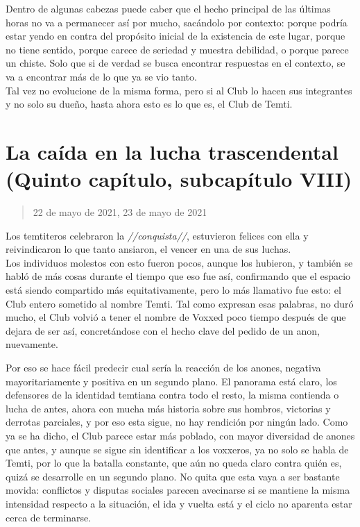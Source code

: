 \documentclass[
  spanish,
]{book}
\begin{document}
Dentro de algunas cabezas puede caber que el hecho principal de las últimas horas no va a permanecer así por mucho, sacándolo por contexto: porque podría estar yendo en contra del propósito inicial de la existencia de este lugar, porque no tiene sentido, porque carece de seriedad y muestra debilidad, o porque parece un chiste. Solo que si de verdad se busca encontrar respuestas en el contexto, se va a encontrar más de lo que ya se vio tanto.\\
Tal vez no evolucione de la misma forma, pero si al Club lo hacen sus integrantes y no solo su dueño, hasta ahora esto es lo que es, el Club de Temti.

\hypertarget{la-cauxedda-en-la-lucha-trascendental-quinto-capuxedtulo-subcapuxedtulo-viii}{%
\section{La caída en la lucha trascendental (Quinto capítulo, subcapítulo VIII)}\label{la-cauxedda-en-la-lucha-trascendental-quinto-capuxedtulo-subcapuxedtulo-viii}}

\begin{quote}
22 de mayo de 2021, 23 de mayo de 2021
\end{quote}

Los temtiteros celebraron la \emph{//conquista//}, estuvieron felices con ella y reivindicaron lo que tanto ansiaron, el vencer en una de sus luchas.\\
Los individuos molestos con esto fueron pocos, aunque los hubieron, y también se habló de más cosas durante el tiempo que eso fue así, confirmando que el espacio está siendo compartido más equitativamente, pero lo más llamativo fue esto: el Club entero sometido al nombre Temti. Tal como expresan esas palabras, no duró mucho, el Club volvió a tener el nombre de Voxxed poco tiempo después de que dejara de ser así, concretándose con el hecho clave del pedido de un anon, nuevamente.

Por eso se hace fácil predecir cual sería la reacción de los anones, negativa mayoritariamente y positiva en un segundo plano. El panorama está claro, los defensores de la identidad temtiana contra todo el resto, la misma contienda o lucha de antes, ahora con mucha más historia sobre sus hombros, victorias y derrotas parciales, y por eso esta sigue, no hay rendición por ningún lado. Como ya se ha dicho, el Club parece estar más poblado, con mayor diversidad de anones que antes, y aunque se sigue sin identificar a los voxxeros, ya no solo se habla de Temti, por lo que la batalla constante, que aún no queda claro contra quién es, quizá se desarrolle en un segundo plano. No quita que esta vaya a ser bastante movida: conflictos y disputas sociales parecen avecinarse si se mantiene la misma intensidad respecto a la situación, el ida y vuelta está y el ciclo no aparenta estar cerca de terminarse.
\end{document}
